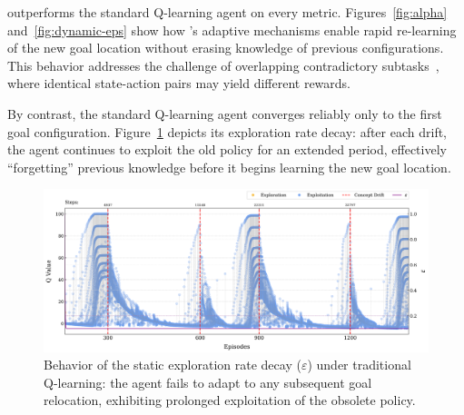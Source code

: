 \begin{table}
    \centering
    \caption{Performance of each agent over 1,000 runs: average number of steps $\pm$ relative standard deviation (as a percentage of the mean) to reach the goal after each drift, and total steps for all 1,500 episodes (fewer steps indicate better performance).}
    
    \label{tab:multi}
\end{table}

\adaptiverl outperforms the standard Q-learning agent on every metric. Figures~\ref{fig:alpha} and~\ref{fig:dynamic-eps} show how \adaptiverl's adaptive mechanisms enable rapid re-learning of the new goal location without erasing knowledge of previous configurations. This behavior addresses the challenge of overlapping contradictory subtasks~\cite{Bagus2022}, where identical state-action pairs may yield different rewards.

By contrast, the standard Q-learning agent converges reliably only to the first goal configuration. Figure~\ref{fig:static-eps} depicts its exploration rate decay: after each drift, the agent continues to exploit the old policy for an extended period, effectively “forgetting” previous knowledge before it begins learning the new goal location.

\begin{figure}
    \centering
    \includegraphics[width=\textwidth]{figures/trad_eps.png}
    \caption{Behavior of the static exploration rate decay ($\varepsilon$) under traditional Q-learning: the agent fails to adapt to any subsequent goal relocation, exhibiting prolonged exploitation of the obsolete policy.}
    \label{fig:static-eps}
\end{figure}

